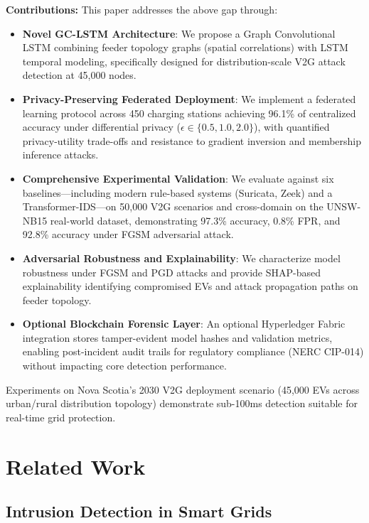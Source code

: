 \documentclass[journal]{IEEEtran}
\begin{document}
\textbf{Contributions:} This paper addresses the above gap through:
\begin{itemize}
    \item \textbf{Novel GC-LSTM Architecture}: We propose a Graph Convolutional LSTM combining feeder topology graphs (spatial correlations) with LSTM temporal modeling, specifically designed for distribution-scale V2G attack detection at 45,000 nodes.

    \item \textbf{Privacy-Preserving Federated Deployment}: We implement a federated learning protocol across 450 charging stations achieving 96.1\% of centralized accuracy under differential privacy ($\epsilon \in \{0.5, 1.0, 2.0\}$), with quantified privacy-utility trade-offs and resistance to gradient inversion and membership inference attacks.

    \item \textbf{Comprehensive Experimental Validation}: We evaluate against six baselines—including modern rule-based systems (Suricata, Zeek) and a Transformer-IDS—on 50,000 V2G scenarios and cross-domain on the UNSW-NB15 real-world dataset, demonstrating 97.3\% accuracy, 0.8\% FPR, and 92.8\% accuracy under FGSM adversarial attack.

    \item \textbf{Adversarial Robustness and Explainability}: We characterize model robustness under FGSM and PGD attacks and provide SHAP-based explainability identifying compromised EVs and attack propagation paths on feeder topology.

    \item \textbf{Optional Blockchain Forensic Layer}: An optional Hyperledger Fabric integration stores tamper-evident model hashes and validation metrics, enabling post-incident audit trails for regulatory compliance (NERC CIP-014) without impacting core detection performance.
\end{itemize}

Experiments on Nova Scotia's 2030 V2G deployment scenario (45,000 EVs across urban/rural distribution topology) demonstrate sub-100ms detection suitable for real-time grid protection.

\section{Related Work}

\subsection{Intrusion Detection in Smart Grids}
\end{document}
